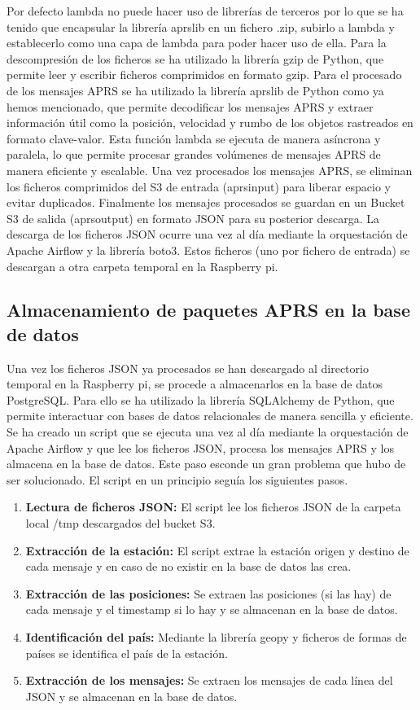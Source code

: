 Por defecto lambda no puede hacer uso de librerías de terceros por lo que se ha tenido que encapsular la librería aprslib en un fichero .zip, subirlo a lambda y establecerlo como una capa de lambda para poder hacer uso de ella.
Para la descompresión de los ficheros se ha utilizado la librería gzip de Python, que permite leer y escribir ficheros comprimidos en formato gzip.
Para el procesado de los mensajes APRS se ha utilizado la librería aprslib de Python como ya hemos mencionado, que permite decodificar los mensajes APRS y extraer información útil como la posición, velocidad y rumbo de los objetos rastreados en formato clave-valor.
Esta función lambda se ejecuta de manera asíncrona y paralela, lo que permite procesar grandes volúmenes de mensajes APRS de manera eficiente y escalable. Una vez procesados los mensajes APRS, se eliminan los ficheros comprimidos del S3 de entrada (aprsinput) para liberar espacio y evitar duplicados.
Finalmente los mensajes procesados se guardan en un Bucket S3 de salida (aprsoutput) en formato JSON para su posterior descarga. La descarga de los ficheros JSON ocurre una vez al día mediante la orquestación de Apache Airflow y la librería boto3. Estos ficheros (uno por fichero de entrada) se descargan a otra carpeta temporal en la Raspberry pi.


\subsection{Almacenamiento de paquetes APRS en la base de datos}
Una vez los ficheros JSON ya procesados se han descargado al directorio temporal en la Raspberry pi, se procede a almacenarlos en la base de datos PostgreSQL. Para ello se ha utilizado la librería SQLAlchemy de Python, que permite interactuar con bases de datos relacionales de manera sencilla y eficiente. Se ha creado un script que se ejecuta una vez al día mediante la orquestación de Apache Airflow y que lee los ficheros JSON, procesa los mensajes APRS y los almacena en la base de datos.
Este paso esconde un gran problema que hubo de ser solucionado. El script en un principio seguía los siguientes pasos.

\begin{enumerate}
	\item \textbf{Lectura de ficheros JSON:} El script lee los ficheros JSON de la carpeta local /tmp descargados del bucket S3.
	\item \textbf{Extracción de la estación:} El script extrae la estación origen y destino de cada mensaje y en caso de no existir en la base de datos las crea.
	\item \textbf{Extracción de las posiciones:} Se extraen las posiciones (si las hay) de cada mensaje y el timestamp si lo hay y se almacenan en la base de datos.
	\item \textbf{Identificación del país:} Mediante la librería geopy y ficheros de formas de países se identifica el país de la estación.
	\item \textbf{Extracción de los mensajes:} Se extraen los mensajes de cada línea del JSON y se almacenan en la base de datos.
\end{enumerate}

